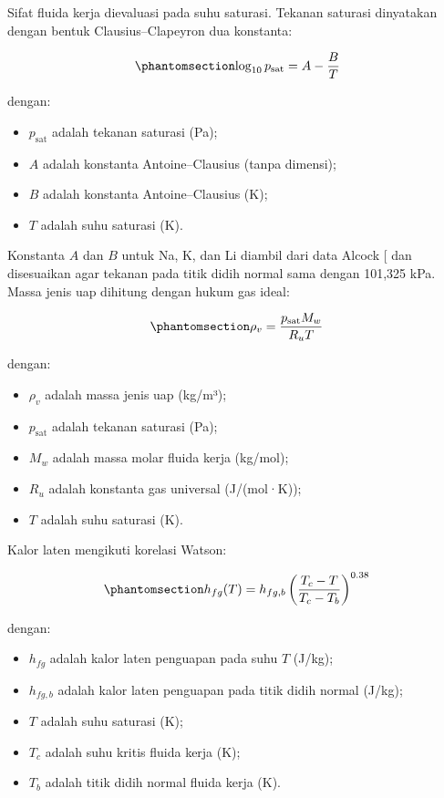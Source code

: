 \documentclass[
  indonesian,
  12pt,
  a4paper,
]{report}
\providecommand{\tightlist}{%
  \setlength{\itemsep}{0pt}\setlength{\parskip}{0pt}}
\begin{document}
Sifat fluida kerja dievaluasi pada suhu saturasi. Tekanan saturasi
dinyatakan dengan bentuk Clausius--Clapeyron dua konstanta:

\begin{equation}\protect\phantomsection\label{eq-psat}{ \log_{10} p_{\mathrm{sat}} = A - \frac{B}{T} }\end{equation}

dengan:

\begin{itemize}
\tightlist
\item
  \(p_{\mathrm{sat}}\) adalah tekanan saturasi (Pa);
\item
  \(A\) adalah konstanta Antoine--Clausius (tanpa dimensi);
\item
  \(B\) adalah konstanta Antoine--Clausius (K);
\item
  \(T\) adalah suhu saturasi (K).
\end{itemize}

Konstanta \(A\) dan \(B\) untuk Na, K, dan Li diambil dari data Alcock
{[}\citeproc{ref-incropera2007}{30}{]} dan disesuaikan agar tekanan pada
titik didih normal sama dengan 101,325 kPa. Massa jenis uap dihitung
dengan hukum gas ideal:

\begin{equation}\protect\phantomsection\label{eq-rhov}{ \rho_v = \frac{p_{\mathrm{sat}}M_w}{R_uT} }\end{equation}

dengan:

\begin{itemize}
\tightlist
\item
  \(\rho_v\) adalah massa jenis uap (kg/m³);
\item
  \(p_{\mathrm{sat}}\) adalah tekanan saturasi (Pa);
\item
  \(M_w\) adalah massa molar fluida kerja (kg/mol);
\item
  \(R_u\) adalah konstanta gas universal (J/(mol·K));
\item
  \(T\) adalah suhu saturasi (K).
\end{itemize}

Kalor laten mengikuti korelasi Watson:

\begin{equation}\protect\phantomsection\label{eq-hfg}{ h_{fg}(T) = h_{fg,b}\left(\frac{T_c-T}{T_c-T_b}\right)^{0.38}
   }\end{equation}

dengan:

\begin{itemize}
\tightlist
\item
  \(h_{fg}\) adalah kalor laten penguapan pada suhu \(T\) (J/kg);
\item
  \(h_{fg,b}\) adalah kalor laten penguapan pada titik didih normal
  (J/kg);
\item
  \(T\) adalah suhu saturasi (K);
\item
  \(T_c\) adalah suhu kritis fluida kerja (K);
\item
  \(T_b\) adalah titik didih normal fluida kerja (K).
\end{itemize}
\end{document}
